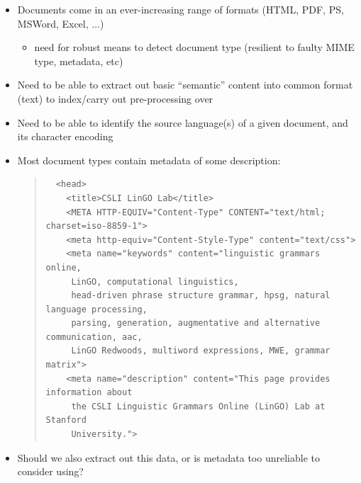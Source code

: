 \documentclass[a4paper,landscape,headrule,footrule,xetex]{foils}
\begin{document}

\begin{itemize}
\item Documents come in an ever-increasing range of formats (HTML,
  PDF, PS, MSWord, Excel, ...)
  \begin{itemize}
  \item need for robust means to detect document type (resilient to
    faulty MIME type, metadata, etc)
  \end{itemize}
\item Need to be able to extract out basic ``semantic'' content into
  common format (text) to index/carry out pre-processing over
\item Need to be able to identify the source language(s) of a given
  document, and its character encoding
\end{itemize}




\begin{itemize}
\item Most document types contain metadata of some description:
  \begin{quote}
    \smaller[2]
\begin{verbatim}
  <head>
    <title>CSLI LinGO Lab</title>
    <META HTTP-EQUIV="Content-Type" CONTENT="text/html; charset=iso-8859-1">
    <meta http-equiv="Content-Style-Type" content="text/css">
    <meta name="keywords" content="linguistic grammars online, 
     LinGO, computational linguistics,
     head-driven phrase structure grammar, hpsg, natural language processing,
     parsing, generation, augmentative and alternative communication, aac,
     LinGO Redwoods, multiword expressions, MWE, grammar matrix">
    <meta name="description" content="This page provides information about
     the CSLI Linguistic Grammars Online (LinGO) Lab at Stanford
     University.">
\end{verbatim}
  \end{quote}
\item Should we also extract out this data, or is metadata too
  unreliable to consider using?
\end{itemize}










\end{document}
